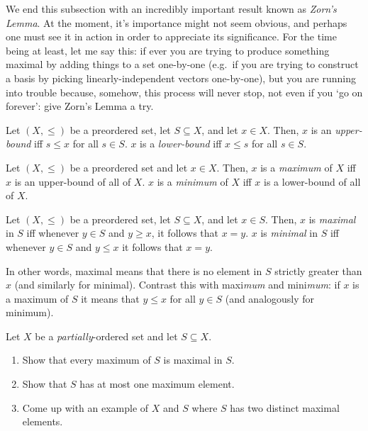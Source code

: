 We end this subsection with an incredibly important result known as \emph{Zorn's Lemma}.  At the moment, it's importance might not seem obvious, and perhaps one must see it in action in order to appreciate its significance.  For the time being at least, let me say this:  if ever you are trying to produce something maximal by adding things to a set one-by-one (e.g.~if you are trying to construct a basis by picking linearly-independent vectors one-by-one), but you are running into trouble because, somehow, this process will never stop, not even if you `go on forever':  give Zorn's Lemma a try.
\begin{dfn}
Let $(X,\leq )$ be a preordered set, let $S\subseteq X$, and let $x\in X$.  Then, $x$ is an \emph{upper-bound} iff $s\leq x$ for all $s\in S$.  $x$ is a \emph{lower-bound} iff $x\leq s$ for all $s\in S$.
\end{dfn}
\begin{dfn}
Let $(X,\leq )$ be a preordered set and let $x\in X$.  Then, $x$ is a \emph{maximum} of $X$ iff $x$ is an upper-bound of all of $X$.  $x$ is a \emph{minimum} of $X$ iff $x$ is a lower-bound of all of $X$.
\end{dfn}
\begin{dfn}
Let $(X,\leq )$ be a preordered set, let $S\subseteq X$, and let $x\in S$.  Then, $x$ is \emph{maximal} in $S$ iff whenever $y\in S$ and $y\geq x$, it follows that $x=y$.  $x$ is \emph{minimal} in $S$ iff whenever $y\in S$ and $y\leq x$ it follows that $x=y$.
\begin{rmk}
In other words, maximal means that there is no element in $S$ strictly greater than $x$ (and similarly for minimal).  Contrast this with maxi\emph{mum} and mini\emph{mum}:  if $x$ is a maximum of $S$ it means that $y\leq x$ for all $y\in S$ (and analogously for minimum).
\end{rmk}
\end{dfn}
\begin{exr}
Let $X$ be a \emph{partially}-ordered set and let $S\subseteq X$.
\begin{enumerate}
\item Show that every maximum of $S$ is maximal in $S$.
\item Show that $S$ has at most one maximum element.
\item Come up with an example of $X$ and $S$ where $S$ has two distinct maximal elements.
\end{enumerate}
\end{exr}
